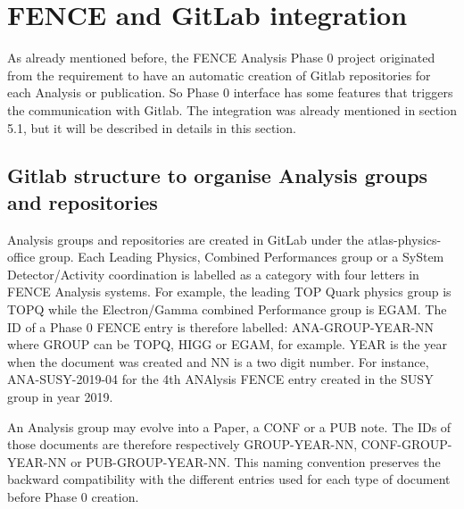 \section{FENCE and GitLab integration}
\label{sec:FENCE_and_Gitlab_integration}
As already mentioned before, the FENCE Analysis Phase 0 project originated from the requirement to have an automatic creation of Gitlab repositories for each Analysis or publication. So Phase 0 interface has some features that triggers the communication with Gitlab. The integration was already mentioned in section 5.1, but it will be described in details in this section.

\subsection{Gitlab structure to organise Analysis groups and repositories}
\label{sec:Gitlab_structure_to_organise_Analysis_groups_and_repositories}
Analysis groups and repositories are created in GitLab under the atlas-physics-office group. Each Leading Physics, Combined Performances group or a SyStem Detector/Activity coordination is labelled as a category with four letters in FENCE Analysis systems. For example, the leading TOP Quark physics group is TOPQ while the Electron/Gamma combined Performance group is EGAM. The ID of a Phase 0 FENCE entry is therefore labelled: ANA-GROUP-YEAR-NN where GROUP can be TOPQ, HIGG or EGAM, for example. YEAR is the year when the document was created and NN is a two digit number. For instance, ANA-SUSY-2019-04 for the 4th ANAlysis FENCE entry created in the SUSY group in year 2019.
                    
An Analysis group may evolve into a Paper, a CONF or a PUB note. The IDs of those documents are therefore respectively GROUP-YEAR-NN, CONF-GROUP-YEAR-NN or PUB-GROUP-YEAR-NN. This naming convention preserves the backward compatibility with the different entries used for each type of document before Phase 0 creation.


